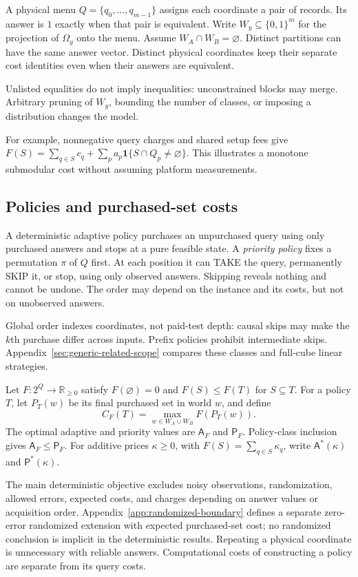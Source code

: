 \documentclass[pdflatex,sn-mathphys-num]{sn-jnl}
\newcommand{\A}{\mathsf{A}}
\newcommand{\Pcost}{\mathsf{P}}
\theoremstyle{thmstyleone}
\theoremstyle{thmstylethree}
\theoremstyle{thmstyletwo}
\begin{document}
A physical menu $Q=\{q_0,\ldots,q_{m-1}\}$ assigns each coordinate a pair of records. Its answer is $1$ exactly when that pair is equivalent. Write $W_y\subseteq\{0,1\}^m$ for the projection of $\Omega_y$ onto the menu. Assume $W_A\cap W_B=\varnothing$. Distinct partitions can have the same answer vector. Distinct physical coordinates keep their separate cost identities even when their answers are equivalent.

Unlisted equalities do not imply inequalities: unconstrained blocks may merge. Arbitrary pruning of $W_y$, bounding the number of classes, or imposing a distribution changes the model.

For example, nonnegative query charges and shared setup fees give
$F(S)=\sum_{q\in S}c_q+\sum_p a_p\mathbf1\{S\cap Q_p\ne\varnothing\}$.
This illustrates a monotone submodular cost without assuming platform measurements.

\subsection{Policies and purchased-set costs}
A deterministic adaptive policy purchases an unpurchased query using only purchased answers and stops at a pure feasible state. A \emph{priority policy} fixes a permutation $\pi$ of $Q$ first. At each position it can TAKE the query, permanently SKIP it, or stop, using only observed answers. Skipping reveals nothing and cannot be undone. The order may depend on the instance and its costs, but not on unobserved answers.

Global order indexes coordinates, not paid-test depth: causal skips may make the $k$th purchase differ across inputs. Prefix policies prohibit intermediate skips. Appendix~\ref{sec:generic-related-scope} compares these classes and full-cube linear strategies.

Let $F:2^Q\to\mathbb R_{\geq0}$ satisfy $F(\varnothing)=0$ and $F(S)\leq F(T)$ for $S\subseteq T$. For a policy $T$, let $P_T(w)$ be its final purchased set in world $w$, and define
\[
 C_F(T)=\max_{w\in W_A\cup W_B} F(P_T(w)).
\]
The optimal adaptive and priority values are $\A_F$ and $\Pcost_F$. Policy-class inclusion gives $\A_F\leq\Pcost_F$. For additive prices $\kappa\geq0$, with $F(S)=\sum_{q\in S}\kappa_q$, write $\A^*(\kappa)$ and $\Pcost^*(\kappa)$.

The main deterministic objective excludes noisy observations, randomization, allowed errors, expected costs, and charges depending on answer values or acquisition order. Appendix~\ref{app:randomized-boundary} defines a separate zero-error randomized extension with expected purchased-set cost; no randomized conclusion is implicit in the deterministic results. Repeating a physical coordinate is unnecessary with reliable answers. Computational costs of constructing a policy are separate from its query costs.
\end{document}
